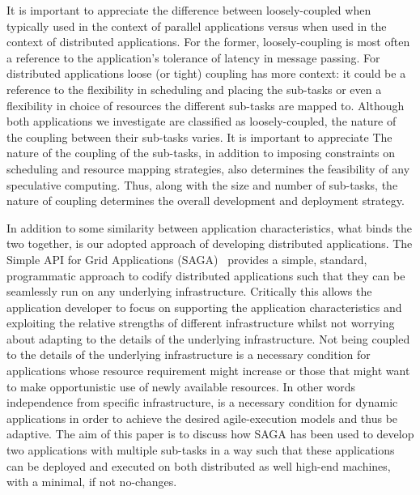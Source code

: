 \documentclass{llncs}
\begin{document}
It is important to appreciate the difference between
loosely-coupled when typically used in the context of parallel
applications versus when used in the context of distributed
applications. For the former, loosely-coupling is most often a
reference to the application's tolerance of latency in message
passing. For distributed applications loose (or tight) coupling has
more context: it could be a reference to the flexibility in scheduling
and placing the sub-tasks or even a flexibility in choice of resources
the different sub-tasks are mapped to. Although both applications we
investigate are classified as loosely-coupled, the nature of the
coupling between their sub-tasks varies. It is important to appreciate
The nature of the coupling of the sub-tasks, in addition to imposing
constraints on scheduling and resource mapping strategies, also
determines the feasibility of any speculative computing.  Thus, along
with the size and number of sub-tasks, the nature of coupling
determines the overall development and deployment strategy.



In addition to some similarity between application characteristics,
what binds the two together, is our adopted approach of developing
distributed applications. The Simple API for Grid Applications
(SAGA)~\cite{saga_url} provides a simple, standard, programmatic
approach to codify distributed applications such that they can be
seamlessly run on any underlying infrastructure. Critically this
allows the application developer to focus on supporting the
application characteristics and exploiting the relative strengths of
different infrastructure whilst not worrying about adapting to the
details of the underlying infrastructure. Not being coupled to the
details of the underlying infrastructure is a necessary condition for
applications whose resource requirement might increase or those that
might want to make opportunistic use of newly available resources. In
other words independence from specific infrastructure, is a necessary
condition for dynamic applications in order to achieve the desired
agile-execution models and thus be adaptive.  The aim of this paper is
to discuss how SAGA has been used to develop two applications with
multiple sub-tasks in a way such that these applications can be
deployed and executed on both distributed as well high-end machines,
with a minimal, if not no-changes.
\end{document}
